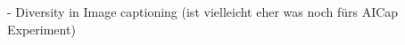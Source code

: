 







\cite{wangDiversityImageCaptioning2022}
- Diversity in Image captioning (ist vielleicht eher was noch fürs AICap Experiment)


